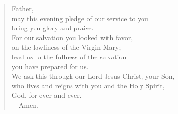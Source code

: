 \prayer

\setlength{\leftmargini}{\prayerleftmargini}

\begin{verse}
Father,\\
may this evening pledge of our service to you\\
bring you glory and praise.\\
For our salvation you looked with favor,\\
on the lowliness of the Virgin Mary;\\
lead us to the fullness of the salvation\\
you have prepared for us.\\
We ask this through our Lord Jesus Christ, your Son,\\
who lives and reigns with you and the Holy Spirit,\\
God, for ever and ever.\\
{\color{red}---\thinspace}Amen.
\end{verse}

\setlength{\leftmargini}{\defleftmargini}